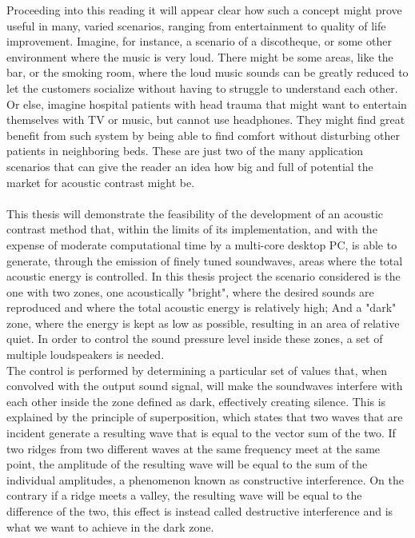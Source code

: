 Proceeding into this reading it will appear clear how such a concept might prove useful in many, varied scenarios, ranging from entertainment to quality of life improvement. Imagine, for instance, a scenario of a discotheque, or some other environment where the music is very loud. There might be some areas, like the bar, or the smoking room, where the loud music sounds can be greatly reduced to let the customers socialize without having to struggle to understand each other. Or else, imagine hospital patients with head trauma that might want to entertain themselves with TV or music, but cannot use headphones. They might find great benefit from such system by being able to find comfort without disturbing other patients in neighboring beds. These are just two of the many application scenarios that can give the reader an idea how big and full of potential the market for acoustic contrast might be.
\\
\\
This thesis will demonstrate the feasibility of the development of an acoustic contrast method that, within the limits of its implementation, and with the expense of moderate computational time by a multi-core desktop PC, is able to generate, through the emission of finely tuned soundwaves, areas where the total acoustic energy is controlled. In this thesis project the scenario considered is the one with two zones, one acoustically "bright", where the desired sounds are reproduced and where the total acoustic energy is relatively high; And a "dark" zone, where the energy is kept as low as possible, resulting in an area of relative quiet. In order to control the sound pressure level inside these zones, a set of multiple loudspeakers is needed.
\\
The control is performed by determining a particular set of values that, when convolved with the output sound signal, will make the soundwaves interfere with each other inside the zone defined as dark, effectively creating silence. This is explained by the principle of superposition, which states that two waves that are incident generate a resulting wave that is equal to the vector sum of the two. If two ridges from two different waves at the same frequency meet at the same point, the amplitude of the resulting wave will be equal to the sum of the individual amplitudes, a phenomenon known as constructive interference. On the contrary if a ridge meets a valley, the resulting wave will be equal to the difference of the two, this effect is instead called destructive interference and is what we want to achieve in the dark zone.
